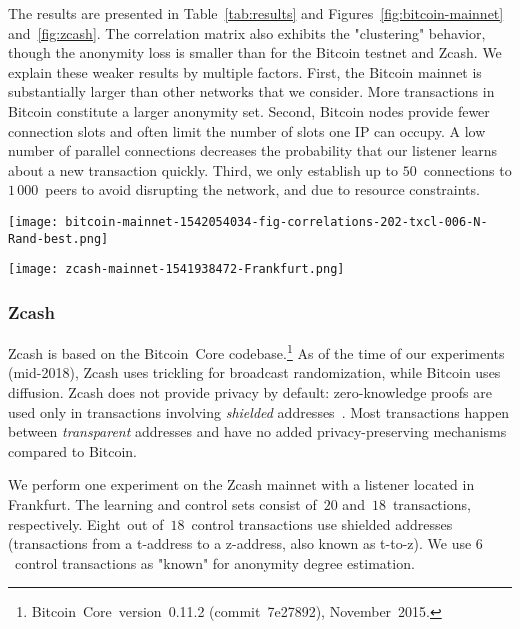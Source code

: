 The results are presented in Table~\ref{tab:results} and Figures~\ref{fig:bitcoin-mainnet} and~\ref{fig:zcash}.
The correlation matrix also exhibits the "clustering" behavior, though the anonymity loss is smaller than for the Bitcoin testnet and Zcash.
We explain these weaker results by multiple factors.
First, the Bitcoin mainnet is substantially larger than other networks that we consider.
More transactions in Bitcoin constitute a larger anonymity set.
Second, Bitcoin nodes provide fewer connection slots and often limit the number of slots one IP can occupy.
A low number of parallel connections decreases the probability that our listener learns about a new transaction quickly.
Third, we only establish up to $50$~connections to $1\,000$~peers to avoid disrupting the network, and due to resource constraints.

\begin{figure*}
	\centering
	\begin{minipage}{0.5\textwidth}
		\centering
		\texttt{[image: bitcoin-mainnet-1542054034-fig-correlations-202-txcl-006-N-Rand-best.png]}
		\caption{Transaction clustering for Bitcoin mainnet.}
		\label{fig:bitcoin-mainnet}
	\end{minipage}\hfill
	\begin{minipage}{0.5\textwidth}
		\centering
		\texttt{[image: zcash-mainnet-1541938472-Frankfurt.png]}
		\caption{Transaction clustering for Zcash.}
		\label{fig:zcash}
	\end{minipage}\hfill
\end{figure*}

\subsubsection{Zcash}

Zcash is based on the Bitcoin~Core codebase.\footnote{Bitcoin~Core~version~0.11.2 (commit~7e27892), November~2015.}
As of the time of our experiments (mid-2018), Zcash uses trickling for broadcast randomization, while Bitcoin uses diffusion.
Zcash does not provide privacy by default: zero-knowledge proofs are used only in transactions involving \textit{shielded} addresses~\cite{Kappos2018}.
Most transactions happen between \textit{transparent} addresses and have no added privacy-preserving mechanisms compared to Bitcoin.

We perform one experiment on the Zcash mainnet with a listener located in Frankfurt.
The learning and control sets consist of~$20$ and~$18$~transactions, respectively.
Eight~out of~$18$~control transactions use shielded addresses (transactions from a t-address to a z-address, also known as t-to-z).
We use $6$~control transactions as "known" for anonymity degree estimation.

